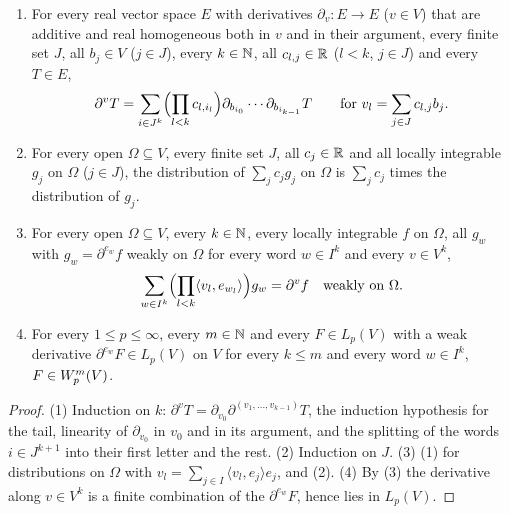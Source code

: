 \begin{lemma}
\label{lem:weak-derivative-words}
\leanok
{}
\begin{enumerate}
  \item For every real vector space $E$ with derivatives $\partial_v \colon E \to E$ ($v \in V$)
    that are additive and real homogeneous both in $v$ and in their argument, every finite set
    $J$, all $b_j \in V$ ($j \in J$), every $k \in \mathbb{N}$, all $c_{l,j} \in \mathbb{R}$ ($l < k$, $j \in J$)
    and every $T \in E$,
    \[
      \partial^v T = \sum_{i \in J^k} \Bigl(\prod_{l < k} c_{l, i_l}\Bigr)
        \partial_{b_{i_0}} \cdots \partial_{b_{i_{k-1}}} T
      \qquad \text{for } v_l = \sum_{j \in J} c_{l,j} b_j .
    \]
  \item For every open $\Omega \subseteq V$, every finite set $J$, all $c_j \in \mathbb{R}$ and all
    locally integrable $g_j$ on $\Omega$ ($j \in J$), the distribution of $\sum_j c_j g_j$ on
    $\Omega$ is $\sum_j c_j$ times the distribution of $g_j$.
  \item For every open $\Omega \subseteq V$, every $k \in \mathbb{N}$, every locally integrable $f$ on
    $\Omega$, all $g_w$ with $g_w = \partial^{e_w} f$ weakly on $\Omega$ for every word
    $w \in I^k$ and every $v \in V^k$,
    \[
      \sum_{w \in I^k} \Bigl(\prod_{l < k} \langle v_l, e_{w_l} \rangle\Bigr) g_w = \partial^v f
      \quad \text{weakly on } \Omega .
    \]
  \item For every $1 \leq p \leq \infty$, every $m \in \mathbb{N}$ and every $F \in L_p(V)$ with a weak
    derivative $\partial^{e_w} F \in L_p(V)$ on $V$ for every $k \leq m$ and every word
    $w \in I^k$, $F \in W^{m}_{p}(V)$.
\end{enumerate}
\end{lemma}

\begin{proof}
\leanok
(1) Induction on $k$: $\partial^v T = \partial_{v_0} \partial^{(v_1, \dots, v_{k-1})} T$, the
induction hypothesis for the tail, linearity of $\partial_{v_0}$ in $v_0$ and in its argument,
and the splitting of the words $i \in J^{k+1}$ into their first letter and the rest.
(2) Induction on $J$. (3) (1) for distributions on $\Omega$ with
$v_l = \sum_{j \in I} \langle v_l, e_j \rangle e_j$, and (2). (4) By (3) the derivative along
$v \in V^k$ is a finite combination of the $\partial^{e_w} F$, hence lies in $L_p(V)$.
\end{proof}


